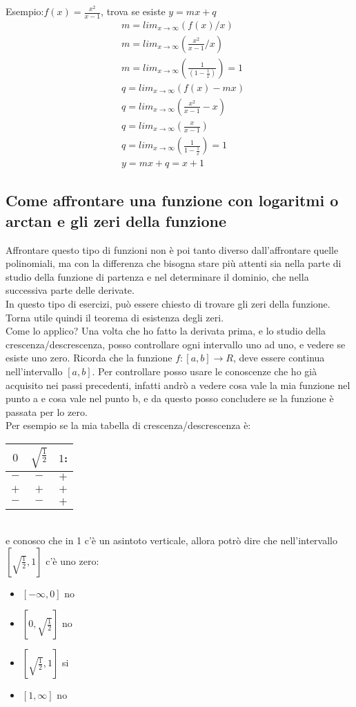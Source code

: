 \documentclass[11pt]{article}
\begin{document}
Esempio:$f(x) = \frac{x^{2}}{x-1}$, trova se esiste $y = mx + q$
\begin{align*}
    &m = lim_{x \rightarrow \infty}(f(x)/x)\\
    &m = lim_{x \rightarrow \infty}(\frac{x^{2}}{x-1}/x)\\
    &m = lim_{x \rightarrow \infty}(\frac{1}{(1-\frac{1}{x})}) = 1\\
    &q = lim_{x \rightarrow \infty}(f(x) - mx)\\
    &q = lim_{x \rightarrow \infty}(\frac{x^{2}}{x-1} - x)\\
    &q = lim_{x \rightarrow \infty}(\frac{x}{x-1})\\
    &q = lim_{x \rightarrow \infty}(\frac{1}{1 - \frac{1}{x}}) = 1\\
    &y = mx + q = x + 1
\end{align*}
\subsection{Come affrontare una funzione con logaritmi o arctan e gli zeri della funzione}
Affrontare questo tipo di funzioni non è poi tanto diverso dall'affrontare quelle polinomiali, ma con la differenza che bisogna stare più attenti sia 
nella parte di studio della funzione di partenza e nel determinare il dominio, che nella successiva parte delle derivate.\\
In questo tipo di esercizi, può essere chiesto di trovare gli zeri della funzione. Torna utile quindi il teorema di esistenza degli zeri.\\
Come lo applico? Una volta che ho fatto la derivata prima, e lo studio della crescenza/descrescenza, posso controllare ogni intervallo uno ad uno, 
e vedere se esiste uno zero. Ricorda che la funzione $f:[a,b] \rightarrow R$, deve essere continua nell'intervallo $[a,b]$. Per controllare posso usare 
le conoscenze che ho già acquisito nei passi precedenti, infatti andrò a vedere cosa vale la mia funzione nel punto a e cosa vale nel punto b, e da questo posso concludere 
se la funzione è passata per lo zero.\\
Per esempio se la mia tabella di crescenza/descrescenza è:\\
\begin{tabular}{|c|c|c|}
    \hline
    $0$ & $\sqrt{\frac{1}{2}}$ & $1$:\\
    \hline \hline
    $-$ & $-$ & $+$\\
    \hline
    $+$ & $+$ & $+$\\
    \hline\hline
    $-$ & $-$ & $+$\\
    \hline
\end{tabular}\\
e conosco che in 1 c'è un asintoto verticale, allora potrò dire che nell'intervallo $[\sqrt{\frac{1}{2}},1]$ c'è uno zero:
\begin{itemize}
    \item $[-\infty,0]$ no
    \item $[0,\sqrt{\frac{1}{2}}]$ no
    \item $[\sqrt{\frac{1}{2}},1]$ si
    \item $[1,\infty]$ no
\end{itemize}
\end{document}
